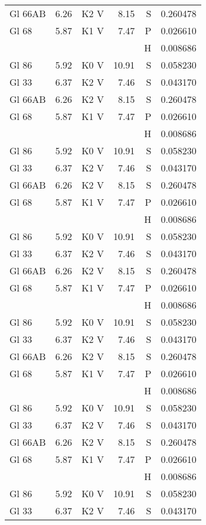 \documentclass{aa}
\begin{document}
\begin{appendix}
\begin{landscape}
\begin{longtable}{lllrrr}
Gl 66AB  & 6.26 & K2 V & 8.15 & S & 0.260478\\
Gl 68    & 5.87 & K1 V & 7.47 & P & 0.026610\\
         &      &      &      & H & 0.008686\\
Gl 86    & 5.92 & K0 V & 10.91& S & 0.058230\\   Gl 33    & 6.37 & K2 V & 7.46 & S & 0.043170\\
Gl 66AB  & 6.26 & K2 V & 8.15 & S & 0.260478\\
Gl 68    & 5.87 & K1 V & 7.47 & P & 0.026610\\
         &      &      &      & H & 0.008686\\
Gl 86    & 5.92 & K0 V & 10.91& S & 0.058230\\   Gl 33    & 6.37 & K2 V & 7.46 & S & 0.043170\\
Gl 66AB  & 6.26 & K2 V & 8.15 & S & 0.260478\\
Gl 68    & 5.87 & K1 V & 7.47 & P & 0.026610\\
         &      &      &      & H & 0.008686\\
Gl 86    & 5.92 & K0 V & 10.91& S & 0.058230\\   Gl 33    & 6.37 & K2 V & 7.46 & S & 0.043170\\
Gl 66AB  & 6.26 & K2 V & 8.15 & S & 0.260478\\
Gl 68    & 5.87 & K1 V & 7.47 & P & 0.026610\\
         &      &      &      & H & 0.008686\\
Gl 86    & 5.92 & K0 V & 10.91& S & 0.058230\\   Gl 33    & 6.37 & K2 V & 7.46 & S & 0.043170\\
Gl 66AB  & 6.26 & K2 V & 8.15 & S & 0.260478\\
Gl 68    & 5.87 & K1 V & 7.47 & P & 0.026610\\
         &      &      &      & H & 0.008686\\
Gl 86    & 5.92 & K0 V & 10.91& S & 0.058230\\   Gl 33    & 6.37 & K2 V & 7.46 & S & 0.043170\\
Gl 66AB  & 6.26 & K2 V & 8.15 & S & 0.260478\\
Gl 68    & 5.87 & K1 V & 7.47 & P & 0.026610\\
         &      &      &      & H & 0.008686\\
Gl 86    & 5.92 & K0 V & 10.91& S & 0.058230\\   Gl 33    & 6.37 & K2 V & 7.46 & S & 0.043170\\

\end{longtable}
\end{landscape}
\end{appendix}
\end{document}
